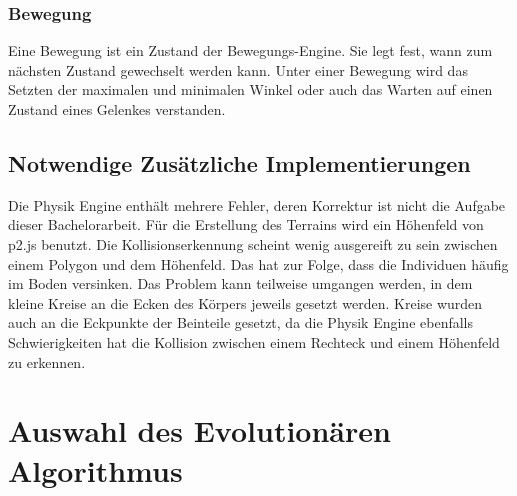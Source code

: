 
    \subsubsection{Bewegung\label{subsub:EngineMovement}}

      Eine Bewegung ist ein Zustand der Bewegungs-Engine.
      Sie legt fest, wann zum nächsten Zustand gewechselt werden kann.
      Unter einer Bewegung wird das Setzten der maximalen und minimalen Winkel oder auch
      das Warten auf einen Zustand eines Gelenkes verstanden.

  \subsection{Notwendige Zusätzliche Implementierungen}

    Die Physik Engine enthält mehrere Fehler, deren Korrektur ist nicht die Aufgabe dieser Bachelorarbeit.
    Für die Erstellung des Terrains wird ein Höhenfeld von p2.js benutzt.
    Die Kollisionserkennung scheint wenig ausgereift zu sein
    zwischen einem Polygon und dem Höhenfeld. Das hat zur Folge, dass die Individuen häufig im Boden versinken.
    Das Problem kann teilweise umgangen werden, in dem kleine Kreise an die Ecken des Körpers jeweils gesetzt werden.
    Kreise wurden auch an die Eckpunkte der Beinteile gesetzt,
    da die Physik Engine ebenfalls Schwierigkeiten hat die Kollision
    zwischen einem Rechteck und einem Höhenfeld zu erkennen.

  \section{Auswahl des Evolutionären Algorithmus}

